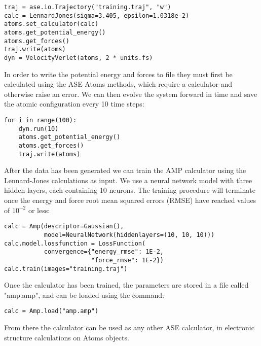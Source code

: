 \begin{verbatim}
traj = ase.io.Trajectory("training.traj", "w")
calc = LennardJones(sigma=3.405, epsilon=1.0318e-2)
atoms.set_calculator(calc)
atoms.get_potential_energy()
atoms.get_forces()
traj.write(atoms)
dyn = VelocityVerlet(atoms, 2 * units.fs)
\end{verbatim}

In order to write the potential energy and forces to file
they must first be calculated using the ASE Atoms methods,
which require a calculator and otherwise raise an error.
We can then evolve the system forward in time
and save the atomic configuration every 10 time steps:

\begin{verbatim}
for i in range(100):
    dyn.run(10)
    atoms.get_potential_energy()
    atoms.get_forces()
    traj.write(atoms)
\end{verbatim}

After the data has been generated we can train the AMP calculator
using the Lennard-Jones calculations as input. 
We use a neural network model with three hidden layers,
each containing 10 neurons.
The training procedure
will terminate once the energy and force root mean squared errors (RMSE)
have reached values of $10^{-2}$ or less:

\begin{verbatim}
calc = Amp(descriptor=Gaussian(),
           model=NeuralNetwork(hiddenlayers=(10, 10, 10)))
calc.model.lossfunction = LossFunction(
           convergence={"energy_rmse": 1E-2,
                        "force_rmse": 1E-2})
calc.train(images="training.traj")
\end{verbatim}

Once the calculator has been trained, the parameters
are stored in a file called "amp.amp",
and can be loaded using the command:

\begin{verbatim}
calc = Amp.load("amp.amp")
\end{verbatim}

From there the calculator can be used as any other ASE calculator,
in electronic structure calculations on Atoms objects.

